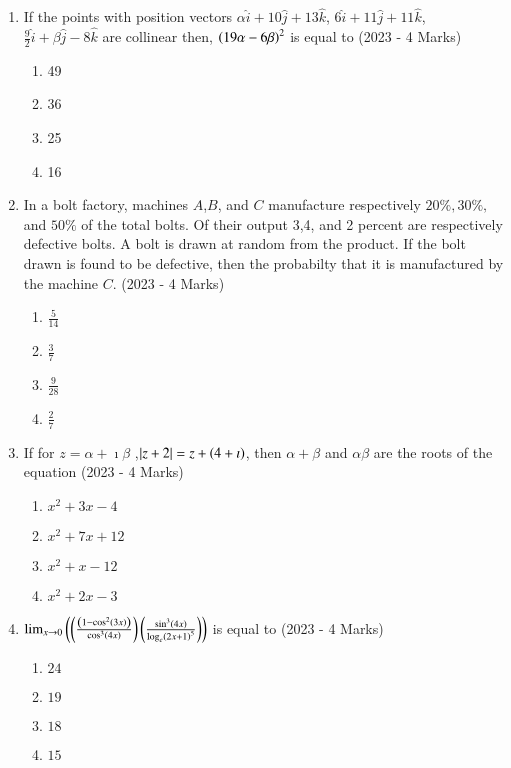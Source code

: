 \documentclass[journal]{IEEEtran}
\begin{document}
\begin{enumerate}
{}
\item{
If the points with position vectors $\alpha\hat{i}+10\hat{j}+13\hat{k}$, $6\hat{i}+11\hat{j}+11\hat{k}$, $\frac{9}{2}\hat{i}+\beta\hat{j}-8\hat{k}$ are collinear then, $\left(19\alpha-6\beta\right)^2$ is equal to
\hfill{(2023 - 4 Marks)}
\begin{multicols}{4}
\begin{enumerate}
\item 49
\item 36
\item 25
\item 16
\end{enumerate}
\end{multicols}

}
\item{
In a bolt factory, machines $A$,$B$, and $C$ manufacture respectively $20\%, 30\%,$ and $50\%$ of the total bolts. Of their output 3,4, and 2 percent are respectively defective bolts. A bolt is drawn at random from the product. If the bolt drawn is found to be defective, then the probabilty that it is manufactured by the machine $C$.
\hfill
{(2023 - 4 Marks)}
\begin{multicols}{4}
\begin{enumerate}
\item $\frac{5}{14}$
\item $\frac{3}{7}$
\item $\frac{9}{28}$
\item $\frac{2}{7}$
\end{enumerate}
\end{multicols}
}
\item{
If for $z=\alpha+\imath\beta$  ,$\left\vert z+2\right\vert=z+\left(4+\imath\right)$, then $\alpha+\beta$ and $\alpha\beta$ are the roots of the equation
\hfill
{(2023 - 4 Marks)}
\begin{multicols}{4}
\begin{enumerate}
\item $x^2+3x-4$
\item $x^2+7x+12$
\item $x^2+x-12$
\item $x^2+2x-3$
\end{enumerate}
\end{multicols}
}
\item{
$\lim_{x \to 0}\left(\left(\frac{\left(1-\cos^2\left(3x\right)\right)}{\cos^3\left(4x\right)}\right)\left(\frac{\sin^3\left(4x\right)}{\log_e\left(2x+1\right)^5}\right)\right)$ is equal to
\hfill
{(2023 - 4 Marks)}
\begin{multicols}{4}
\begin{enumerate}
\item $24$
\item $19$
\item $18$
\item $15$
\end{enumerate}
\end{multicols}
}
\end{enumerate}
\end{document}
